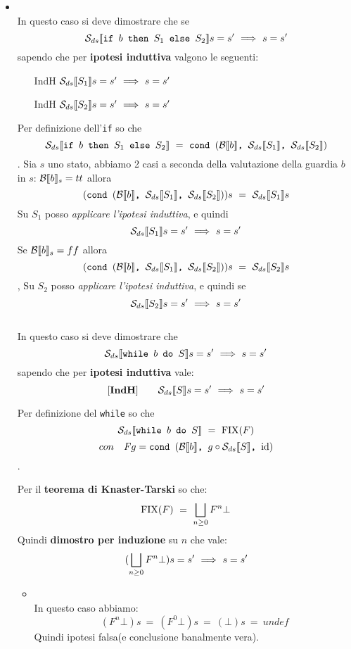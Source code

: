 {\begin{itemize}
    Mi rimane $\dsCtxt{S_2}s$, sul quale,
    supponendo che $\dsCtxt{S_2}s=s'$, posso applicare l'\textit{ipotesi induttiva} e
    ottenendo quindi $\dsCtxt{S_2}s=s$.
    
     Nel caso in cui 
    \[ \nexists{}s'\in\states.\dsCtxt{S_1}s=s'~o~\dsCtxt{S_1}s=s' \] allora si ha che il costrutto vale banalmente (ipotesi falsa).

    \item {} \\
    In questo caso si deve dimostrare che
    se \[ \dsCtxt{\ifABC{b}{S_1}{S_2}}s=s'~\Longrightarrow~s=s' \] sapendo che per
   \textbf{ ipotesi induttiva} valgono le seguenti:
    \begin{itemize}
    \item[IndH] $\dsCtxt{S_1}s=s'~\Longrightarrow~s=s'$
    \item[IndH] $\dsCtxt{S_2}s=s'~\Longrightarrow~s=s'$
	\end{itemize}
    Per definizione dell'\texttt{if} so che 
    \[ \dsCtxt{\ifABC{b}{S_1}{S_2}}~=~\cond{b}{\dsCtxt{S_1}}{\dsCtxt{S_2}} \]. 
    Sia
    $s$ uno stato, abbiamo 2 casi a seconda della valutazione della guardia $b$
    in $s$:
    \subitem[TRUE]  $\evalBbs{b}{s}=tt$ allora \[ (\cond{b}{\dsCtxt{S_1}}{\dsCtxt{S_2}})s
    ~=~\dsCtxt{S_1}s \]
    Su $S_1$ posso\textit{ applicare l'ipotesi induttiva}, e quindi
    \[  \dsCtxt{S_1}s=s'~\Longrightarrow~s=s' \]   
    \subitem[FALSE] Se $\evalBbs{b}{s}=ff$ allora \[ (\cond{b}{\dsCtxt{S_1}}{\dsCtxt{S_2}})s
    ~=~\dsCtxt{S_2}s \], Su $S_2$ posso \textit{applicare l'ipotesi induttiva}, e quindi
    se \[ \dsCtxt{S_2}s=s'~\Longrightarrow~s=s' \]
    \\
     In questo caso si deve dimostrare che
     \[ \dsCtxt{\wbS{b}{S}}s=s'~\Longrightarrow~s=s' \] sapendo che per
    \textbf{ipotesi induttiva }vale: 
    \[ \mathbf{[IndH]}\qquad \dsCtxt{S}s=s'~\Longrightarrow~s=s' \]

    Per definizione del \texttt{while} so che 
   \[  \dsCtxt{\wbS{b}{S}}~=~\fixp{F} \] \[ con \quad  \mathit{F}g = \cond{b}{g \circ \Sds}{\idDS} \].
 
    Per il \textbf{teorema di Knaster-Tarski} so che:
    \[ \fixp{F}~=~\unionsem{n}F^{n}\bot \]
    Quindi \textbf{dimostro per induzione} su $n$ che vale:
     \[ (\unionsem{n}F^{n}\bot)s=s'~\Longrightarrow~s=s' \]

    \begin{itemize}
    \item {} \\
    In questo caso abbiamo:
\[     (F^{n}\bot)s~=~(F^{0}\bot)s~=~(\bot)s~=~undef \]
    Quindi ipotesi falsa(e conclusione banalmente vera).
  

\end{itemize}
\end{itemize}}

